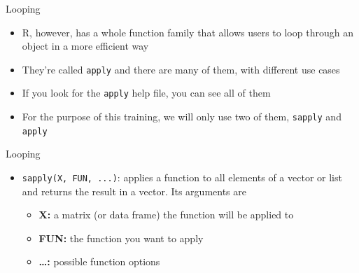 \documentclass[ignorenonframetext,]{beamer}
\providecommand{\tightlist}{%
  \setlength{\itemsep}{0pt}\setlength{\parskip}{0pt}}
\begin{document}
\begin{frame}[fragile]{Looping}

\begin{itemize}
\tightlist
\item
  R, however, has a whole function family that allows users to loop
  through an object in a more efficient way
\item
  They're called \texttt{apply} and there are many of them, with
  different use cases
\item
  If you look for the \texttt{apply} help file, you can see all of them
\item
  For the purpose of this training, we will only use two of them,
  \texttt{sapply} and \texttt{apply}
\end{itemize}

\end{frame}

\begin{frame}[fragile]{Looping}

\begin{itemize}
\tightlist
\item
  \texttt{sapply(X,\ FUN,\ ...)}: applies a function to all elements of
  a vector or list and returns the result in a vector. Its arguments are

  \begin{itemize}
  \tightlist
  \item
    \textbf{X:} a matrix (or data frame) the function will be applied to
  \item
    \textbf{FUN:} the function you want to apply
  \item
    \textbf{\ldots{}:} possible function options
  \end{itemize}
\end{itemize}

\end{frame}
\end{document}
